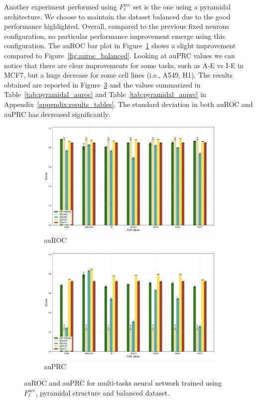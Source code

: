 Another experiment performed using $F_\ell^{\textrm{acc}}$ set is the one using a pyramidal architecture. We choose to maintain the dataset balanced due to the good performance highlighted. Overall, compared to the previous fixed neurons configuration, no particular performance improvement emerge using this configuration. The auROC bar plot in Figure~\ref{fig:auroc_pyramydal} shows a slight improvement compared to Figure~\ref{fig:auroc_balanced}. Looking at auPRC values we can notice that there are clear improvements for some tasks, such as A-E vs I-E in MCF7, but a huge decrease for some cell lines (i.e., A549, H1). The results obtained are reported in Figure~\ref{fig:pyramydal_results} and the values summarized in Table~\ref{tab:pyramidal_auroc} and Table~\ref{tab:pyramidal_auprc} in Appendix~\ref{appendix:results_tables}. The standard deviation in both auROC and auPRC has decreased significantly.  
\begin{figure}[!htbp]
    \centering
    \begin{subfigure}[b]{\textwidth}
        \includegraphics[width=\textwidth]{images/results_plots/pyramydal_auroc.png}
        \caption{auROC}
        \label{fig:auroc_pyramydal}
    \end{subfigure}
    \begin{subfigure}[b]{\textwidth}
        \includegraphics[width=\textwidth]{images/results_plots/pyramydal_auprc.png}
        \caption{auPRC}
        \label{fig:auprc_pyramydal}
    \end{subfigure}
    \caption{auROC and auPRC for multi-tasks neural network trained using $F_\ell^{\textrm{acc}}$, pyramidal structure and balanced dataset.}\label{fig:pyramydal_results}
\end{figure}
